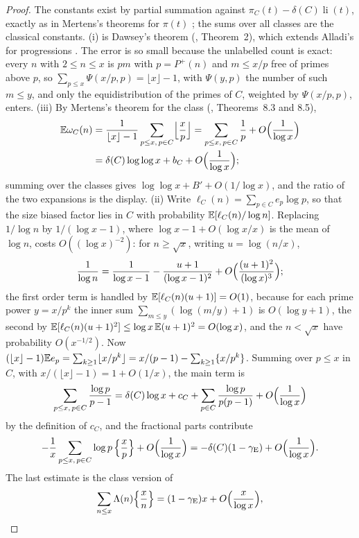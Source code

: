 \begin{proof}
The constants exist by partial summation against $\pi_C(t)-\delta(C)\operatorname{li}(t)$, exactly as in Mertens's theorems for $\pi(t)$ \cite{mertens1874,tenenbaum2015}; the sums over all classes are the classical constants. (i) is Dawsey's theorem (\cite{dawsey2017}, Theorem~2), which extends Alladi's for progressions \cite{alladi1977}. The error is so small because the unlabelled count is exact: every $n$ with $2\le n\le x$ is $pm$ with $p=P^+(n)$ and $m\le x/p$ free of primes above $p$, so $\sum_{p\le x}\Psi(x/p,p)=\lfloor x\rfloor-1$, with $\Psi(y,p)$ the number of such $m\le y$, and only the equidistribution of the primes of $C$, weighted by $\Psi(x/p,p)$, enters. (iii) By Mertens's theorem for the class (\cite{bardestanifreiberg2013}, Theorems~8.3 and 8.5),
\begin{align*}
\mathbb{E}\omega_C(n)&=\frac1{\lfloor x\rfloor-1}\sum_{p\le x,\,p\in C}\Bigl\lfloor\frac xp\Bigr\rfloor=\sum_{p\le x,\,p\in C}\frac1p+O\Bigl(\frac1{\log x}\Bigr)\\
&=\delta(C)\log\log x+b_C+O\Bigl(\frac1{\log x}\Bigr);
\end{align*}
summing over the classes gives $\log\log x+B'+O(1/\log x)$, and the ratio of the two expansions is the display. (ii) Write $\ell_C(n)=\sum_{p\in C}e_p\log p$, so that the size biased factor lies in $C$ with probability $\mathbb{E}[\ell_C(n)/\log n]$. Replacing $1/\log n$ by $1/(\log x-1)$, where $\log x-1+O(\log x/x)$ is the mean of $\log n$, costs $O((\log x)^{-2})$: for $n\ge\sqrt x$, writing $u=\log(n/x)$,
\[
\frac1{\log n}=\frac1{\log x-1}-\frac{u+1}{(\log x-1)^2}+O\Bigl(\frac{(u+1)^2}{(\log x)^3}\Bigr);
\]
the first order term is handled by $\mathbb{E}[\ell_C(n)(u+1)]=O(1)$, because for each prime power $y=x/p^k$ the inner sum $\sum_{m\le y}(\log(m/y)+1)$ is $O(\log y+1)$, the second by $\mathbb{E}[\ell_C(n)(u+1)^2]\le\log x\,\mathbb{E}(u+1)^2=O(\log x)$, and the $n<\sqrt x$ have probability $O(x^{-1/2})$. Now $(\lfloor x\rfloor-1)\mathbb{E} e_p=\sum_{k\ge1}\lfloor x/p^k\rfloor=x/(p-1)-\sum_{k\ge1}\{x/p^k\}$. Summing over $p\le x$ in $C$, with $x/(\lfloor x\rfloor-1)=1+O(1/x)$, the main term is
\[
\sum_{p\le x,\,p\in C}\frac{\log p}{p-1}=\delta(C)\log x+c_C+\sum_{p\in C}\frac{\log p}{p(p-1)}+O\Bigl(\frac1{\log x}\Bigr)
\]
by the definition of $c_C$, and the fractional parts contribute
\[
-\frac1x\sum_{p\le x,\,p\in C}\log p\,\Bigl\{\frac xp\Bigr\}+O\Bigl(\frac1{\log x}\Bigr)=-\delta(C)(1-\gamma_{\mathrm E})+O\Bigl(\frac1{\log x}\Bigr).
\]
The last estimate is the class version of
\[
\sum_{n\le x}\Lambda(n)\Bigl\{\frac xn\Bigr\}=(1-\gamma_{\mathrm E})x+O\Bigl(\frac x{\log x}\Bigr),
\]
\end{proof}
